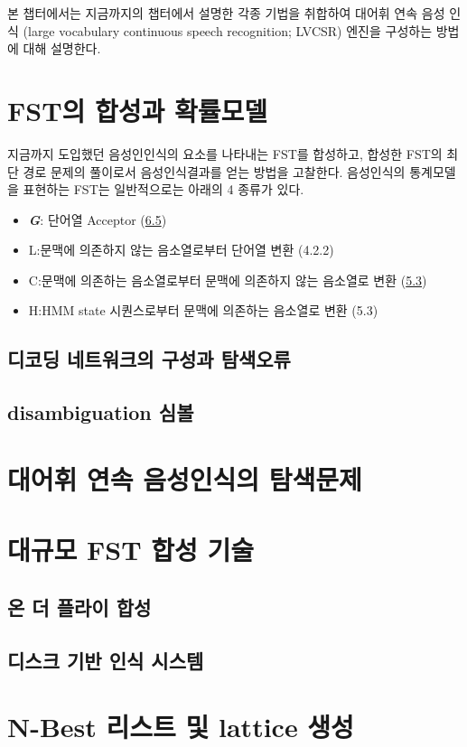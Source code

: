 \documentclass{book}
\begin{document}
\noindent
본 챕터에서는 지금까지의 챕터에서 설명한 각종 기법을 취합하여 대어휘 연속 음성 인식 (large vocabulary continuous speech recognition; LVCSR) 엔진을 구성하는 방법에 대해 설명한다. 

\section{FST의 합성과 확률모델}
지금까지 도입했던 음성인인식의 요소를 나타내는 FST를 합성하고, 합성한 FST의 최단 경로 문제의 풀이로서 음성인식결과를 얻는 방법을 고찰한다. 음성인식의 통계모델을 표현하는 FST는 일반적으로는 아래의 4 종류가 있다. 

\begin{itemize}
    \item \textit{\textbf{G}}: 단어열 Acceptor (\hyperref[sec:N-gram-FST]{6.5})
    \item L:문맥에 의존하지 않는 음소열로부터 단어열 변환 (4.2.2)
    \item C:문맥에 의존하는 음소열로부터 문맥에 의존하지 않는 음소열로 변환 (\hyperref[sec:context-dependant-model]{5.3})
    \item H:HMM state 시퀀스로부터 문맥에 의존하는 음소열로 변환 (5.3)
\end{itemize}

\subsection{디코딩 네트워크의 구성과 탐색오류}
\subsection{disambiguation 심볼}

\section{대어휘 연속 음성인식의 탐색문제}
\section{대규모 FST 합성 기술}
\subsection{온 더 플라이 합성}
\subsection{디스크 기반 인식 시스템}

\section{N-Best 리스트 및 lattice 생성}
\end{document}
